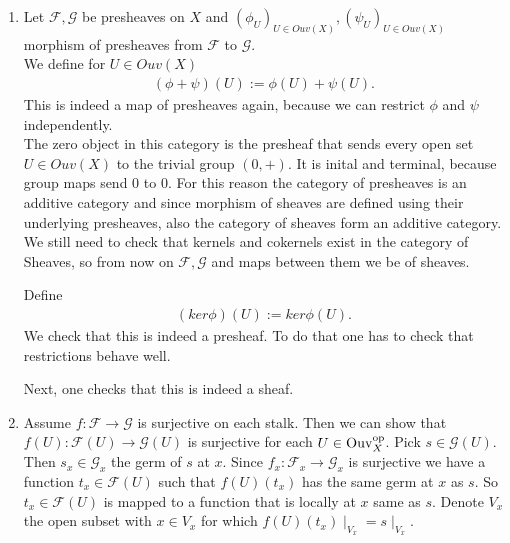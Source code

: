 \begin{exercise}{3}
    \begin{enumerate}
        \item{Let $\mathcal{F}, \mathcal{G}$ be presheaves on $X$ and
            $(\phi_U)_{U\in Ouv(X)}, (\psi_U)_{U\in Ouv(X)}$ morphism of
            presheaves from $\mathcal{F}$ to $\mathcal{G}$.\\ We define for
            $U\in Ouv(X)$
            \begin{align*}
                (\phi+\psi)(U):=\phi(U)+\psi(U).
            \end{align*}
            This is indeed a map of presheaves again, because we can restrict
            $\phi$ and $\psi$ independently.\\ The zero object in this category
            is the presheaf that sends every open set $U\in Ouv(X)$ to the
            trivial group $(0,+)$. It is inital and terminal, because group maps
            send $0$ to $0$. For this reason the category of presheaves is an
            additive category and since morphism of sheaves are defined using
            their underlying presheaves, also the category of sheaves form an
            additive category.\\ We still need to check that kernels and
            cokernels exist in the category of Sheaves, so from now on
            $\mathcal{F},\mathcal{G}$ and maps between them we be of sheaves.

            Define 
            \begin{align*}
                (ker\phi)(U):=ker\phi(U).
            \end{align*}
            We check that this is indeed a presheaf. To do that one has to check
            that restrictions behave well.

            Next, one checks that this is indeed a sheaf.
            }
        \item{Assume $f \colon \mathcal{F} \rightarrow \mathcal{G}$ is
            surjective on each stalk. Then we can show that $f(U) \colon
            \mathcal{F}(U) \rightarrow \mathcal{G}(U)$ is surjective for each $U
            \in \operatorname{Ouv}^{\text{op}}_X$. Pick $s \in \mathcal{G}(U)$. Then $s_x \in
            \mathcal{G}_x$ the germ of $s$ at $x$. Since $f_x \colon
            \mathcal{F}_x \rightarrow \mathcal{G}_x$ is surjective we have a
            function $t_x \in \mathcal{F}(U)$ such that $f(U)(t_x)$ has the same
            germ at $x$ as $s$. So $t_x \in \mathcal{F}(U)$ is mapped to a
            function that is locally at $x$ same as $s$. Denote $V_x$ the open
            subset with $x \in V_x$ for which $f(U)(t_x) \mid_{V_x} = s
            \mid_{V_x}$.

}
\end{enumerate}
\end{exercise}
